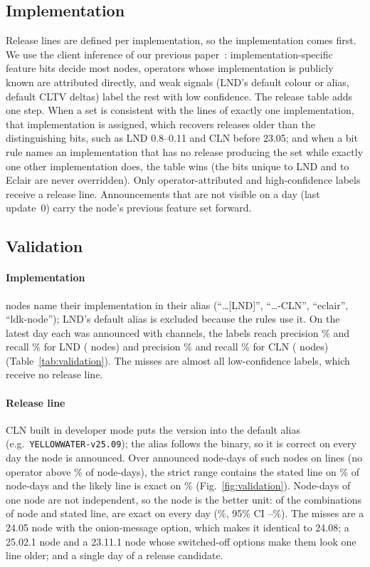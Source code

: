 \subsection{Implementation}
Release lines are defined per implementation, so the implementation comes first. We use the client inference of our
previous paper~\cite{kumar2026clientdiversity}: implementation-specific feature bits decide most nodes, operators
whose implementation is publicly known are attributed directly, and weak signals (LND's default colour or alias,
default CLTV deltas) label the rest with low confidence. The release table adds one step. When a set is consistent
with the lines of exactly one implementation, that implementation is assigned, which recovers releases older than the
distinguishing bits, such as LND 0.8--0.11 and CLN before 23.05; and when a bit rule names an implementation that has
no release producing the set while exactly one other implementation does, the table wins (the bits unique to LND and
to Eclair are never overridden). Only operator-attributed and high-confidence labels receive a release line.
Announcements that are not visible on a day (last update~0) carry the node's previous feature set forward.

\subsection{Validation}
\label{sec:validation}
\paragraph{Implementation}
\NAnchorClient{} nodes name their implementation in their alias (``\ldots{}[LND]'', ``\ldots{}-CLN'', ``eclair'',
``ldk-node''); LND's default alias is excluded because the rules use it. On the latest day each was announced with
channels, the labels reach precision \PrecLND\% and recall \RecLND\% for LND (\NAnchorLND{} nodes) and precision
\PrecCLN\% and recall \RecCLN\% for CLN (\NAnchorCLN{} nodes) (Table~\ref{tab:validation}). The misses are almost
all low-confidence labels, which receive no release line.

\paragraph{Release line}
CLN built in developer mode puts the version into the default alias (e.g.\ \texttt{YELLOWWATER-v25.09}); the alias
follows the binary, so it is correct on every day the node is announced. Over \NVerNodeDays{} announced node-days of
\NVerNodes{} such nodes on \NVerLines{} lines (no operator above \PctVerMaxOperator\% of node-days), the strict range
contains the stated line on \PctVerStrict\% of node-days and the likely line is exact on \PctVerLikely\%
(Fig.~\ref{fig:validation}). Node-days of one node are not independent, so the node is the better unit: of the
\NVerNodeLines{} combinations of node and stated line, \NVerNodeLinesExact{} are exact on every day
(\PctNodeLineExact\%, 95\% CI \NodeLineCILo--\NodeLineCIHi\%). The misses are a 24.05 node with the onion-message
option, which makes it identical to 24.08; a 25.02.1 node and a 23.11.1 node whose switched-off options make them look
one line older; and a single day of a release candidate.

